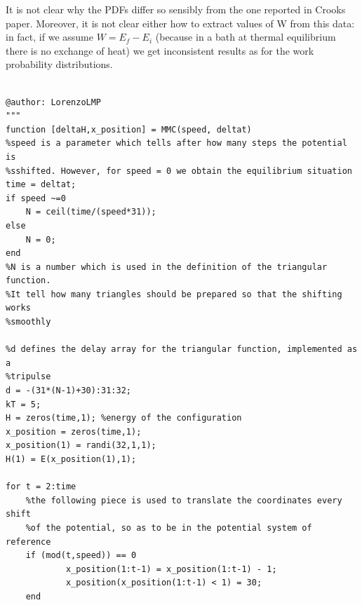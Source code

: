 \documentclass[11pt,letterpaper]{article}
\begin{document}
It is not clear why the PDFs differ so sensibly from the one reported in Crooks paper. Moreover, it is not clear either how to extract values of W from this data: in fact, if we assume $W = E_f - E_i$ (because in a bath at thermal equilibrium there is no exchange of heat) we get inconsistent results as for the work probability distributions.

\begin{lstlisting}

@author: LorenzoLMP
"""
function [deltaH,x_position] = MMC(speed, deltat)
%speed is a parameter which tells after how many steps the potential is
%sshifted. However, for speed = 0 we obtain the equilibrium situation
time = deltat;
if speed ~=0
    N = ceil(time/(speed*31));
else
    N = 0;
end
%N is a number which is used in the definition of the triangular function.
%It tell how many triangles should be prepared so that the shifting works
%smoothly

%d defines the delay array for the triangular function, implemented as a
%tripulse
d = -(31*(N-1)+30):31:32;
kT = 5;
H = zeros(time,1); %energy of the configuration
x_position = zeros(time,1);
x_position(1) = randi(32,1,1);
H(1) = E(x_position(1),1);

for t = 2:time
    %the following piece is used to translate the coordinates every shift
    %of the potential, so as to be in the potential system of reference
    if (mod(t,speed)) == 0
            x_position(1:t-1) = x_position(1:t-1) - 1;
            x_position(x_position(1:t-1) < 1) = 30;
    end
    

\end{lstlisting}
\end{document}

